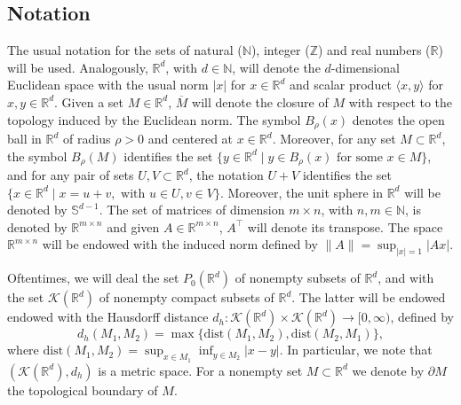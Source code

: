 \documentclass[reqno]{amsart}
\theoremstyle{definition}
\numberwithin{equation}{section}
\newcommand{\N}{\mathbb{N}}
\newcommand{\R}{\mathbb{R}}
\newcommand{\Z}{\mathbb{Z}}
\newcommand{\K}{\mathcal{K}}
\newcommand{\dist}{\mathrm{dist}}
\begin{document}
\subsection{Notation}
The usual notation for the sets of natural ($\N$), integer ($\Z$) and real numbers ($\R$) will be used. Analogously, $\R^d$, with $d\in\N$, will denote the $d$-dimensional Euclidean space with the usual norm $|x|$ for $x\in\R^d$ and scalar product $\langle x, y\rangle$ for $x,y\in\R^d$. 
Given a set $M\in\R^d$, $\overline M$ will denote the closure of $M$ with respect to the topology induced by the Euclidean norm.
The symbol $B_\rho(x)$ denotes the open ball in $\R^d$ of radius $\rho>0$ and centered at $x\in\R^d$. 
Moreover, for any set $M\subset\R^d$, the symbol $B_\rho(M)$ identifies the set $\{y\in\R^d\mid y\in B_\rho(x) \text{ for some } x\in M\}$, and for any pair of sets $U,V\subset \R^d$, the notation $U+V$ identifies the set $\{x\in\R^d\mid x=u+v,\text{ with } u\in U, v\in V\}$. Moreover, the unit sphere in $\R^d$ will be denoted by $\mathbb{S}^{d-1}$.
The set of matrices of dimension $m\times n$, with $n,m\in\N$, is denoted by  $\R^{m\times n}$ and given $A\in\R^{m\times n}$, $A^\top$ will denote its transpose. 
The space $\R^{m\times n}$ will be endowed with the induced norm defined by $\|A\|=\sup_{|x|=1}|Ax|$.

Oftentimes, we will deal the set $P_0(\R^d)$ of nonempty subsets of $\R^d$, and with the set $\K(\R^d)$  of nonempty compact subsets of $\R^d$. The latter will be endowed endowed with the Hausdorff distance $d_h:\K(\R^d)\times\K(\R^d)\to [0,\infty)$, defined by 
\[
d_h(M_1,M_2)= \max\{\dist(M_1,M_2),\dist(M_2,M_1)\},
\]
where $\dist(M_1,M_2)=\sup_{x\in M_1}\inf_{y\in M_2} |x-y|$. In particular, we note that $(\K(\R^d),d_h)$ is a metric space. For a nonempty set $M\subset\R^d$ we denote by $\partial M$ the topological boundary of $M$.

\end{document}
